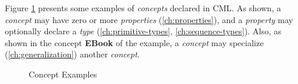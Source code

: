 Figure \ref{fig:ex:concepts} presents some examples of \emph{concepts} declared in CML.
As shown,
a \emph{concept} may have zero or more \emph{properties}
(\ref{ch:properties}),
and a \emph{property} may optionally declare a \emph{type}
(\ref{ch:primitive-types}, \ref{ch:sequence-types}).
Also, as shown in the concept \textbf{EBook} of the example,
a \emph{concept} may specialize
(\ref{ch:generalization})
another \emph{concept}.

\begin{figure}
\verbatimfont{\small}

\caption{Concept Examples}
\label{fig:ex:concepts}
\end{figure}
